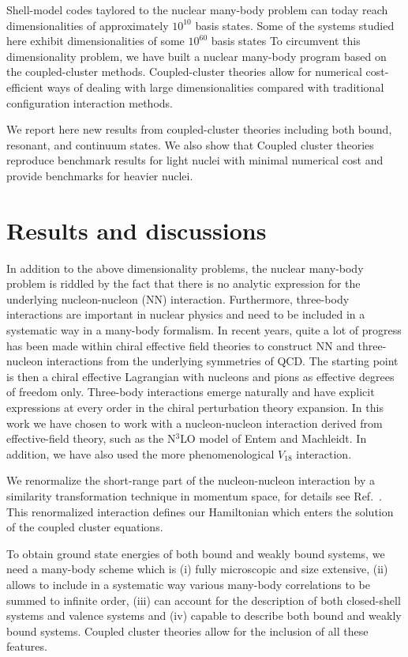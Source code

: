 \documentclass{ws-procs975x65}
\begin{document}
Shell-model codes taylored to the nuclear 
many-body problem can today reach dimensionalities of approximately $10^{10}$ basis states. Some of the systems studied
here exhibit dimensionalities of some $10^{60}$ basis states
To circumvent this dimensionality problem, we have built a nuclear many-body
program based on the coupled-cluster methods. Coupled-cluster theories allow for numerical cost-efficient ways of
dealing with large dimensionalities compared with traditional configuration interaction methods.

We report here new results from coupled-cluster theories including  both bound, resonant, and continuum
states\cite{hagen1,hagen2,hagen3,hagen4}.  
We also show that Coupled cluster theories reproduce benchmark results for light nuclei with minimal numerical cost  
and  provide benchmarks for heavier nuclei.


\section{Results and discussions}

In addition to the above dimensionality problems, the nuclear many-body problem is riddled by the fact that
there is no analytic expression for the underlying nucleon-nucleon (NN) interaction. 
Furthermore, three-body interactions are
important in nuclear physics and need to be included in a systematic way in a many-body formalism.
In recent years, quite a lot of progress has been made within  chiral effective field theories
to construct NN and three-nucleon interactions from the underlying symmetries of QCD.  
The starting point is then a chiral effective Lagrangian with nucleons and pions as effective degrees of freedom only.
Three-body interactions emerge naturally and have explicit expressions at 
every order in the chiral perturbation theory expansion. 
In this work we have chosen to work with a nucleon-nucleon interaction derived from 
effective-field theory,
such as the N$^3$LO model of Entem and Machleidt. 
In addition, we have also used the more phenomenological $V_{18}$ 
interaction. 

We renormalize the short-range part of the nucleon-nucleon interaction by a similarity transformation
technique in momentum space, for details see 
Ref.~\cite{hagen4}.
This renormalized  interaction defines our  Hamiltonian which enters the solution of the coupled cluster equations. 

To obtain ground state energies of both bound and weakly bound systems, we need a many-body scheme which is
(i) fully microscopic and size extensive, (ii) allows to include in a systematic way various many-body
correlations to be summed to infinite order, (iii) can account for 
the description of both closed-shell systems and valence systems and  (iv)  capable
to describe both bound and weakly bound systems.
Coupled cluster theories allow for the inclusion of  all these features. 
\end{document}
